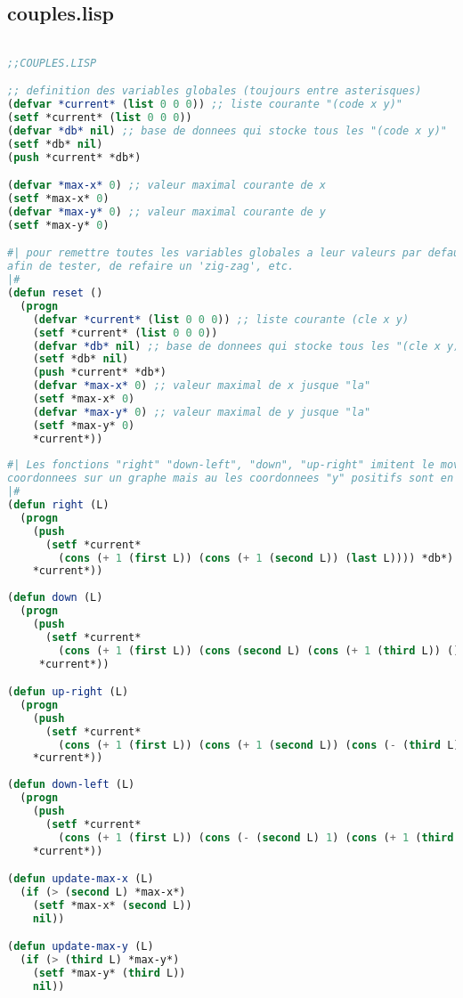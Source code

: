 \documentclass{article}
\begin{document}
\subsection{couples.lisp}
\label{coupleslisp}
\begin{lstlisting}[language=Lisp, basicstyle=\footnotesize]

;;COUPLES.LISP

;; definition des variables globales (toujours entre asterisques)
(defvar *current* (list 0 0 0)) ;; liste courante "(code x y)"
(setf *current* (list 0 0 0)) 
(defvar *db* nil) ;; base de donnees qui stocke tous les "(code x y)"
(setf *db* nil)
(push *current* *db*)

(defvar *max-x* 0) ;; valeur maximal courante de x
(setf *max-x* 0)
(defvar *max-y* 0) ;; valeur maximal courante de y
(setf *max-y* 0)

#| pour remettre toutes les variables globales a leur valeurs par defaut 
afin de tester, de refaire un 'zig-zag', etc.
|#
(defun reset ()
  (progn
    (defvar *current* (list 0 0 0)) ;; liste courante (cle x y)
    (setf *current* (list 0 0 0))  
    (defvar *db* nil) ;; base de donnees qui stocke tous les "(cle x y)"
    (setf *db* nil)
    (push *current* *db*)
    (defvar *max-x* 0) ;; valeur maximal de x jusque "la"
    (setf *max-x* 0)
    (defvar *max-y* 0) ;; valeur maximal de y jusque "la"
    (setf *max-y* 0)
    *current*))
  
#| Les fonctions "right" "down-left", "down", "up-right" imitent le movement des 
coordonnees sur un graphe mais au les coordonnees "y" positifs sont en DESSOUS du graphe
|#
(defun right (L)
  (progn
    (push
      (setf *current*
        (cons (+ 1 (first L)) (cons (+ 1 (second L)) (last L)))) *db*)
    *current*))
  
(defun down (L)
  (progn
    (push
      (setf *current*
        (cons (+ 1 (first L)) (cons (second L) (cons (+ 1 (third L)) ())))) *db*)
     *current*))

(defun up-right (L)
  (progn
    (push
      (setf *current*
        (cons (+ 1 (first L)) (cons (+ 1 (second L)) (cons (- (third L) 1) ())))) *db*)
    *current*))
    
(defun down-left (L)
  (progn
	(push
	  (setf *current*
	    (cons (+ 1 (first L)) (cons (- (second L) 1) (cons (+ 1 (third L)) ())))) *db*)
    *current*))

(defun update-max-x (L)
  (if (> (second L) *max-x*)
    (setf *max-x* (second L))
    nil))

(defun update-max-y (L)
  (if (> (third L) *max-y*)
    (setf *max-y* (third L))
    nil))


\end{lstlisting}
\end{document}
